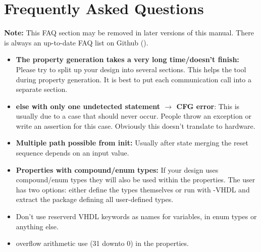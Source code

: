 \section{Frequently Asked Questions}
\label{sec:faq}

\textbf{Note:} %
This FAQ section may be removed in later versions of this manual. %
There is always an up-to-date FAQ list on Github (\cite{web-scam}). %

\begin{itemize}
\item \textbf{The property generation takes a very long time/doesn't
    finish:} Please try to split up your design into several
  sections. %
  This helps the tool during property generation. %
  It is best to put each communication call into a separate section. %

\item \textbf{else with only one undetected statement $\rightarrow$
    CFG error}: This is usually due to a case that should never
  occur. %
People throw an exception or write an assertion for this case. %
  Obviously this doesn't translate to hardware. %


\item \textbf{Multiple path possible from init:} Usually after state merging
  the reset sequence depends on an input value. %

\item \textbf{Properties with compound/enum types:} If your design
  uses compound/enum types they will also be used within the
  properties. %
  The user has two options: either define the types themselves or run
  \SCAM{} with -VHDL and extract the package defining all user-defined
  types. %

\item Don't use reserverd VHDL keywords as names for variables, in
  enum types or anything else. %

\item overflow arithmetic use (31 downto 0) in the properties. %

%


\end{itemize}

